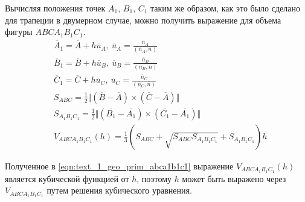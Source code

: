 Вычисляя положения точек $A_1$, $B_1$, $C_1$ таким же образом, как это было сделано для трапеции в двумерном случае, можно получить выражение для объема фигуры $ABCA_1B_1C_1$.
\begin{equation}\label{eqn:text_1_geo_prim_abca1b1c1}
	\begin{aligned}
		& \overline{A}_1 = \overline{A} + h \overline{u}_A, \ \overline{u}_A = \frac{\overline{n}_A}{(\overline{n}_A, \overline{n})} \\
		& \overline{B}_1 = \overline{B} + h \overline{u}_B, \ \overline{u}_B = \frac{\overline{n}_B}{(\overline{n}_B, \overline{n})} \\
		& \overline{C}_1 = \overline{C} + h \overline{u}_C, \ \overline{u}_C = \frac{\overline{n}_C}{(\overline{n}_C, \overline{n})} \\
		& S_{ABC} = \frac{1}{2} \Vert (\overline{B} - \overline{A}) \times (\overline{C} - \overline{A}) \Vert \\
		& S_{A_1B_1C_1} = \frac{1}{2} \Vert (\overline{B_1} - \overline{A_1}) \times (\overline{C_1} - \overline{A_1}) \Vert \\
		& V_{ABCA_1B_1C_1}(h) = \frac{1}{3} \left( S_{ABC} + \sqrt{S_{ABC} S_{A_1B_1C_1}} + S_{A_1B_1C_1} \right) h
	\end{aligned}
\end{equation}

Полученное в \eqref{eqn:text_1_geo_prim_abca1b1c1} выражение $V_{ABCA_1B_1C_1}(h)$ является кубической функцией от $h$, поэтому $h$ может быть выражено через $V_{ABCA_1B_1C_1}$ путем решения кубического уравнения.
